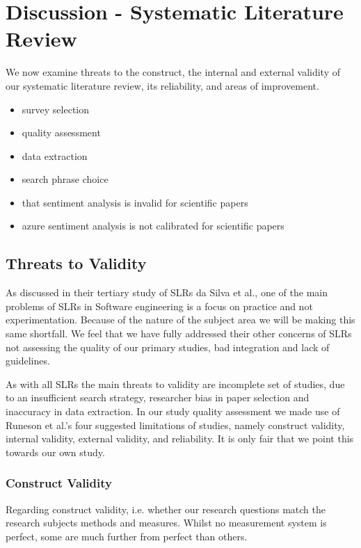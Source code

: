 \section{Discussion - Systematic Literature Review}
We now examine threats to the construct, the internal and external validity of our systematic literature review, its reliability, and areas of improvement.

\begin{itemize}
    \item survey selection
    \item quality assessment
    \item data extraction
    \item search phrase choice
    \item that sentiment analysis is invalid for scientific papers
    \item azure sentiment analysis is not calibrated for scientific papers
\end{itemize}
 
\subsection{Threats to Validity}  
As discussed in their tertiary study of SLRs da Silva et al.\cite{DaSilvaFabioQ.B2011Syos}, one of the main problems of SLRs in Software engineering is a focus on practice and not experimentation.
Because of the nature of the subject area we will be making this same shortfall. 
We feel that we have fully addressed their other concerns of SLRs not assessing the quality of our primary studies, bad integration and lack of guidelines.

As with all SLRs the main threats to validity are incomplete set of studies, due to an insufficient search strategy, researcher bias in paper selection and inaccuracy in data extraction.
In our study quality assessment we made use of Runeson et al.'s\cite{runeson2009guidelines} four suggested limitations of studies, namely construct validity, internal validity, external validity, and reliability.
It is only fair that we point this towards our own study.

\subsubsection{Construct Validity}
Regarding construct validity, i.e. whether our research questions match the research subjects methods and measures.
Whilst no measurement system is perfect, some are much further from perfect than others.

